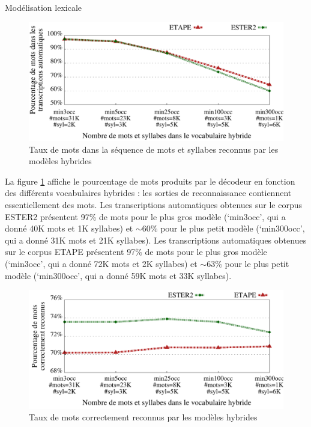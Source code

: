\documentclass{style/these}
\begin{document}
\begin{part}{Modélisation lexicale}
\begin{figure}[h!]
\centering
\includegraphics[scale=0.64]{images/results/wordsInWS_sv.pdf}
\caption{Taux de mots dans la séquence de mots et syllabes reconnus par les modèles hybrides}
\label{Fig:pWordsInWS}
\end{figure}

La figure \ref{Fig:pWordsInWS} affiche le pourcentage de mots produits par le décodeur en fonction des différents vocabulaires hybrides : les sorties de reconnaissance contiennent essentiellement des mots. 
Les transcriptions automatiques obtenues sur le corpus ESTER2 présentent 97\% de mots pour le plus gros modèle (`min3occ', qui a donné 40K mots et 1K syllabes) et $\sim$60\% pour le plus petit modèle (`min300occ', qui a donné 31K mots et 21K syllabes). 
Les transcriptions automatiques obtenues sur le corpus ETAPE présentent 97\% de mots pour le plus gros modèle (`min3occ', qui a donné 72K mots et 2K syllabes) et $\sim$63\% pour le plus petit modèle (`min300occ', qui a donné 59K mots et 33K syllabes).

\begin{figure}[h!]
\centering
\includegraphics[scale=0.64]{images/results/correctWordsInWS_sv.pdf}
\caption{Taux de mots correctement reconnus par les modèles hybrides}
\label{Fig:cWordsInWS}
\end{figure}


\end{part}
\end{document}
